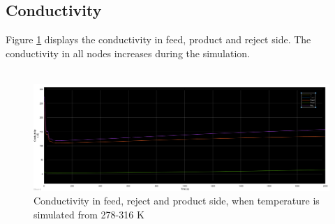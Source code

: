 \subsection{Conductivity}
Figure \ref{fig:conden} displays the conductivity in feed, product and reject side. The conductivity in all nodes increases during the simulation. \\
\\
\begin{figure}[h]
  \label{fig:conden}
  \includegraphics[width=1.1\linewidth]{cond.PNG}
  \caption{Conductivity in feed, reject and product side, when temperature is simulated from 278-316 K}
\end{figure}
\newpage


